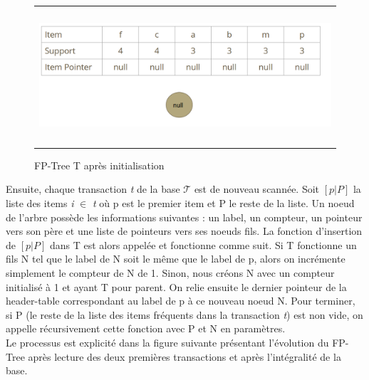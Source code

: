 \documentclass[a4paper,10pt]{report}
\begin{document}
\begin{figure}
	\begin{adjustwidth}{-1cm}{}
	\begin{tabular}{l}
	\includegraphics[width=15cm,height=5cm]{./img/fptree_init.jpg}\\
	\end{tabular}
	\caption{\label{fig:text}FP-Tree T après initialisation}
	\end{adjustwidth}
\end{figure}

Ensuite, chaque transaction \emph{t} de la base $\mathcal{T}$ est de nouveau scannée. Soit $[ p | P ]$ la liste des items \emph{i} $\in$ \emph{t} où p est le premier item et P le reste de la liste. Un noeud de l'arbre possède les informations suivantes : un label, un compteur, un pointeur vers son père et une liste de pointeurs vers ses noeuds fils. La fonction d'insertion de $[ p | P ]$  dans T est alors appelée et fonctionne comme suit. Si T fonctionne un fils N tel que le label de N soit le même que le label de p, alors on incrémente simplement le compteur de N de 1. Sinon, nous créons N avec un compteur initialisé à 1 et ayant T pour parent. On relie ensuite le dernier pointeur de la header-table correspondant au label de p à ce nouveau noeud N. Pour terminer, si P (le reste de la liste des items fréquents dans la transaction \emph{t}) est non vide, on appelle récursivement cette fonction avec P et N en paramètres. \\
Le processus est explicité dans la figure suivante présentant l'évolution du FP-Tree après lecture des deux premières transactions et après l'intégralité de la base. \\
\end{document}
